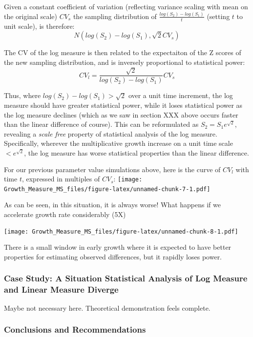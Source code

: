 \documentclass[]{article}
\begin{document}
Given a constant coefficient of variation (reflecting variance scaling
with mean on the original scale) \(CV_s\) the sampling distribution of
\(\frac{log(S_2) - log(S_1)}{t}\) (setting \(t\) to unit scale), is
therefore: \[ N(log(S_2) - log(S_1), \sqrt2CV_s)\]

The CV of the log measure is then related to the expectaiton of the Z
scores of the new sampling distribution, and is inversely proportional
to statistical power: \[CV_l =\frac{\sqrt2}{log(S_2) - log(S_1)}CV_s\]

Thus, where \(log(S_2) - log(S_1) > \sqrt2\) over a unit time increment,
the log measure should have greater statistical power, while it loses
statistical power as the log measure declines (which as we saw in
section XXX above occurs faster than the linear difference of course).
This can be reformulated as \(S_2=S_1e^{\sqrt2}\), revealing a
\emph{scale free} property of statistical analysis of the log measure.
Specifically, wherever the multiplicative growth increase on a unit time
scale \(<e^{\sqrt2}\), the log measure has worse statistical properties
than the linear difference.

For our previous parameter value simulations above, here is the curve of
\(CV_l\) with time \(t\), expressed in multiples of \(CV_s\):
\texttt{[image: Growth\_Measure\_MS\_files/figure-latex/unnamed-chunk-7-1.pdf]}

As can be seen, in this situation, it is always worse! What happens if
we accelerate growth rate considerably (5X)

\texttt{[image: Growth\_Measure\_MS\_files/figure-latex/unnamed-chunk-8-1.pdf]}

There is a small window in early growth where it is expected to have
better properties for estimating observed differences, but it rapidly
loses power.

\subsubsection{Case Study: A Situation Statistical Analysis of Log
Measure and Linear Measure
Diverge}\label{case-study-a-situation-statistical-analysis-of-log-measure-and-linear-measure-diverge}

Maybe not necessary here. Theoretical demonstration feels complete.

\subsubsection{Conclusions and
Recommendations}\label{conclusions-and-recommendations}
\end{document}

